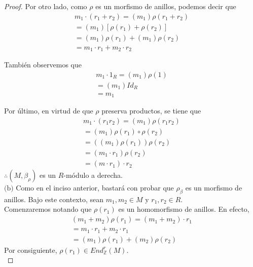 \documentclass{article}
\newcommand{\lrprth}[1]{
    \left(#1\right)
}
\newcommand{\zend}[2]{
    End_{\mathbb{Z}}^{#2}\lrprth{#1}
}
\theoremstyle{definition}
\theoremstyle{plain}
\theoremstyle{plain}
\theoremstyle{definition}
\theoremstyle{definition}
\theoremstyle{definition}
\theoremstyle{definition}
\theoremstyle{definition}
\theoremstyle{definition}
\begin{document}
\begin{enumerate}[label=\textbf{Ej \arabic*.}]
\begin{proof}
		Por otro lado, como $\rho$ es un morfismo de anillos, podemos decir que
		\begin{align*}
			m_{1} \cdot \lrprth{r_{1}+r_{2}}=\lrprth{m_{1}} \rho \lrprth{r_{1}+r_{2}}\\
			=\lrprth{m_{1}}[\rho \lrprth{r_{1}} + \rho \lrprth{r_{2}}]\\
			=\lrprth{m_{1}} \rho \lrprth{r_{1}} + \lrprth{m_{1}} \rho \lrprth{r_{2}}\\
			=m_{1} \cdot r_{1} + m_{2} \cdot r_{2}
		\end{align*}

		También observemos que
		\begin{align*}
			m_{1} \cdot 1_{R}=\lrprth{m_{1}} \rho \lrprth{1}\\
			=\lrprth{m_{1}}Id_{R}\\
			=m_{1}
		\end{align*}
	
		Por último, en virtud de que $\rho$ preserva productos, se tiene que
		\begin{align*}
			m_{1} \cdot \lrprth{r_{1}r_{2}}=\lrprth{m_{1}} \rho \lrprth{r_{1}r_{2}}\\
			=\lrprth{m_{1}} \rho \lrprth{r_{1}} \circ \rho \lrprth{r_{2}}\\
			=\lrprth{\lrprth{m_{1}} \rho \lrprth{r_{1}}} \rho \lrprth{r_{2}}\\
			=\lrprth{m_{1} \cdot r_{1}} \rho \lrprth{r_{2}}\\
			=\lrprth{m \cdot r_{1}} \cdot r_{2}
		\end{align*}
		$\therefore\lrprth{M, \beta_{\rho}}$ es un $R$-módulo a derecha.\\

		$\boxed{\text{(b)}}$ Como en el inciso anterior, bastará con probar que $\rho_{\beta}$ es un morfismo de anillos. Bajo este contexto, sean $m_{1},m_{2} \in M$ y $r_{1},r_{2} \in R$.\\
	
		Comenzaremos notando que $\rho \lrprth{r_{1}}$ es un homomorfismo de anillos. En efecto,
		\begin{align*}
			\lrprth{m_{1}+m_{2}} \rho \lrprth{r_{1}}=\lrprth{m_{1}+m_{2}} \cdot r_{1}\\
			=m_{1} \cdot r_{1} + m_{2} \cdot r_{1}\\
			=\lrprth{m_{1}} \rho \lrprth{r_{1}} + \lrprth{m_{2}} \rho \lrprth{r_{2}}
		\end{align*}
		Por consiguiente, $\rho\lrprth{r_{1}}\in\zend{M}{r}$.\\
	

\end{proof}
\end{enumerate}
\end{document}
